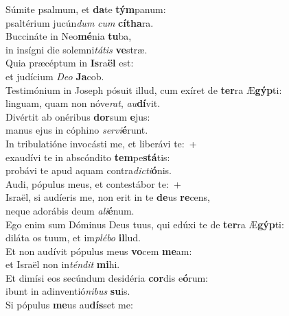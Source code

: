 \evenverse Súmite psalmum, et \textbf{da}te \textbf{tým}panum:~\*\\
\evenverse psaltérium jucún\textit{dum} \textit{cum} \textbf{cí}\textbf{tha}ra.\\
\oddverse Buccináte in Neo\textbf{mé}nia \textbf{tu}ba,~\*\\
\oddverse in insígni die solemni\textit{tá}\textit{tis} \textbf{ve}stræ.\\
\evenverse Quia præcéptum in \textbf{Is}ra\textbf{ël} est:~\*\\
\evenverse et judícium \textit{De}\textit{o} \textbf{Ja}cob.\\
\oddverse Testimónium in Joseph pósuit illud, cum exíret de \textbf{ter}ra Æ\textbf{gýp}ti:~\*\\
\oddverse linguam, quam non nóve\textit{rat}, \textit{au}\textbf{dí}vit.\\
\evenverse Divértit ab onéribus \textbf{dor}sum \textbf{e}jus:~\*\\
\evenverse manus ejus in cóphino \textit{ser}\textit{vi}\textbf{é}runt.\\
\oddverse In tribulatióne invocásti me, et liberávi te:~+\\
\oddverse  exaudívi te in abscóndito \textbf{tem}pe\textbf{stá}tis:~\*\\
\oddverse probávi te apud aquam contra\textit{di}\textit{cti}\textbf{ó}nis.\\
\evenverse Audi, pópulus meus, et contestábor te:~+\\
\evenverse  Israël, si audíeris me, non erit in te \textbf{de}us \textbf{re}cens,~\*\\
\evenverse neque adorábis deum \textit{a}\textit{li}\textbf{é}num.\\
\oddverse Ego enim sum Dóminus Deus tuus, qui edúxi te de \textbf{ter}ra Æ\textbf{gýp}ti:~\*\\
\oddverse diláta os tuum, et im\textit{plé}\textit{bo} \textbf{il}lud.\\
\evenverse Et non audívit pópulus meus \textbf{vo}cem \textbf{me}am:~\*\\
\evenverse et Israël non in\textit{tén}\textit{dit} \textbf{mi}hi.\\
\oddverse Et dimísi eos secúndum desidéria \textbf{cor}dis e\textbf{ó}rum:~\*\\
\oddverse ibunt in adinventió\textit{ni}\textit{bus} \textbf{su}is.\\
\evenverse Si pópulus \textbf{me}us au\textbf{dís}set me:~\*\\
